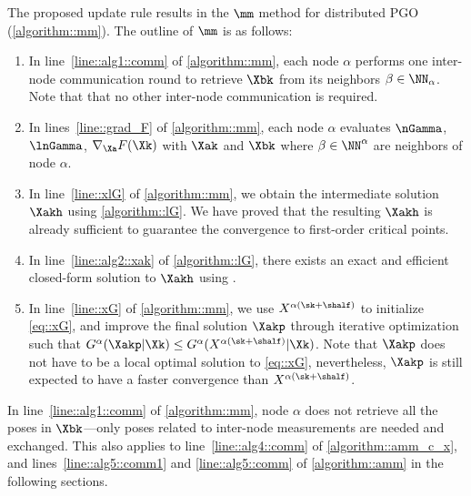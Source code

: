 The proposed update rule results in the $\mm$ method for distributed PGO (\cref{algorithm::mm}). The outline of  $\mm$  is as follows:
\begin{enumerate}[leftmargin=0.45cm]
\item In line~\ref{line::alg1::comm} of \cref{algorithm::mm}, each node $\alpha$ performs one inter-node communication round to retrieve $\Xbk$ from its neighbors $\beta\in\NN_{\alpha}$. Note that that no other inter-node communication is required.
\item In lines~\ref{line::grad_F} of \cref{algorithm::mm}, each node $\alpha$ evaluates $\nGamma$, $\lnGamma$, $\nabla_{\Xa} F(\Xk)$ with $\Xak$ and $\Xbk$ where $\beta\in\NN^\alpha$ are neighbors of node $\alpha$. 
\item In line~\ref{line::xlG} of \cref{algorithm::mm}, we obtain the intermediate solution $\Xakh$ using \cref{algorithm::lG}. We have proved that the resulting $\Xakh$ is already sufficient to guarantee the convergence to first-order critical points.
\item In line~\ref{line::alg2::xak} of \cref{algorithm::lG}, there exists an exact and efficient closed-form solution to $\Xakh$ using .

\item In line~\ref{line::xG} of \cref{algorithm::mm}, we use $X^{\alpha(\sk+\shalf)}$ to initialize \cref{eq::xG}, and improve the final solution $\Xakp$ through iterative optimization such that $G^{\alpha}(\Xakp|\Xk)\leq G^{\alpha}(X^{\alpha(\sk+\shalf)}|\Xk)$. Note that $\Xakp$ does not have to be a local optimal solution to \cref{eq::xG}, nevertheless, $\Xakp$ is still expected to have a faster convergence than $X^{\alpha(\sk+\shalf)}$.
\end{enumerate}

\begin{remark}
	\highlight
	In line~\ref{line::alg1::comm} of \cref{algorithm::mm}, node $\alpha$ does not retrieve all the poses in $\Xbk$---only poses related to inter-node measurements are needed and exchanged. This also applies to line~\ref{line::alg4::comm} of \cref{algorithm::amm_c_x}, and lines~\ref{line::alg5::comm1} and \ref{line::alg5::comm} of \cref{algorithm::amm} in the following sections.
\end{remark}

